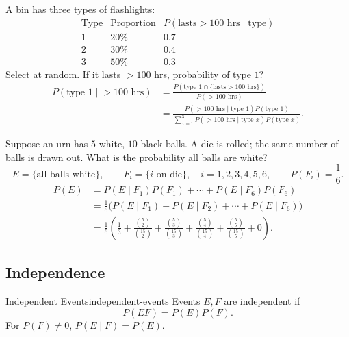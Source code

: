 \begin{example}
  A bin has three types of flashlights:
  \[
    \begin{array}{c|c|c}
      \text{Type} & \text{Proportion} & P(\text{lasts}>100\text{ hrs}\mid\text{type}) \\ \hline
      1           & 20\%              & 0.7                                           \\
      2           & 30\%              & 0.4                                           \\
      3           & 50\%              & 0.3
    \end{array}
  \]
  Select at random. If it lasts $>100$ hrs, probability of type $1$?
  \begin{align*}
    P(\text{type }1\mid{}>100\text{ hrs})
     & =\frac{P(\text{type }1\cap\{\text{lasts}>100\text{ hrs}\})}{P(>100\text{ hrs})} \\
     & =\frac{P(>100\text{ hrs}\mid\text{type }1)P(\text{type }1)}
    {\displaystyle\sum_{x=1}^3 P(>100\text{ hrs}\mid\text{type }x)P(\text{type }x)}.
  \end{align*}
\end{example}
\begin{example}
  Suppose an urn has $5$ white, $10$ black balls. A die is rolled; the same number of balls is drawn out. What is the probability all balls are white?
  \[
    E=\{\text{all balls white}\},\qquad
    F_i=\{i\text{ on die}\},\quad i=1,2,3,4,5,6,
    \qquad P(F_i)=\frac16.
  \]
  \begin{align*}
    P(E) & =P(E\mid F_1)P(F_1)+\cdots+P(E\mid F_6)P(F_6)                     \\
         & =\frac16\bigl(P(E\mid F_1)+P(E\mid F_2)+\cdots+P(E\mid F_6)\bigr) \\
         & =\frac16\left(\frac13+\frac{\binom52}{\binom{15}2}
    +\frac{\binom53}{\binom{15}3}+\frac{\binom54}{\binom{15}4}
    +\frac{\binom55}{\binom{15}5}+0\right).
  \end{align*}
\end{example}

\subsection{Independence}

\begin{definition}{Independent Events}{independent-events}
  Events $E,F$ are independent if
  \[
    P(EF)=P(E)P(F).
  \]
  For $P(F)\ne0$, $P(E\mid F)=P(E)$.
\end{definition}

